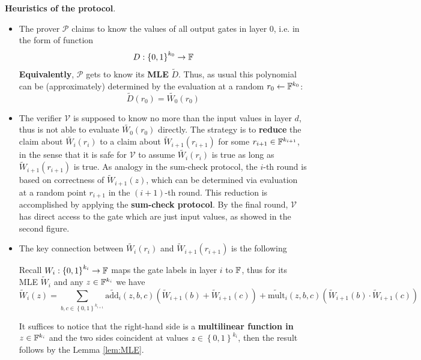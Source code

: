 \documentclass{article}
\begin{document}
\textbf{Heuristics of the protocol}. 
\begin{itemize}
\item The prover $\mathcal{P}$ claims to know the values of all output gates in layer $0$, i.e. in the form of function
\begin{equation*}
D: \left\{ 0, 1 \right\}^{k_0} \rightarrow \mathbb{F}
\end{equation*}
\textbf{Equivalently}, $\mathcal{P}$ gets to know its \textbf{MLE} $\tilde{D}$. Thus, as usual this polynomial can be (approximately) determined by the evaluation at a random $r_0 \leftarrow \mathbb{F}^{k_0}$:
\begin{equation*}
\widetilde{D}(r_0) = \widetilde{W_0}(r_0)
\end{equation*}
\item The verifier $\mathcal{V}$ is supposed to know no more than the input values in layer $d$, thus is not able to evaluate $\widetilde{W_0}(r_0)$ directly. The strategy is to \textbf{reduce} the claim about $\widetilde{W_i}(r_{i})$ to a claim about $\widetilde{W}_{i+1}(r_{i+1})$ for some $r_{i+1} \in \mathbb{F}^{k_{i+1}}$, in the sense that it is safe for $\mathcal{V}$ to assume $\widetilde{W_i}(r_{i})$ is true as long as  $\widetilde{W}_{i+1}(r_{i+1})$ is true. As analogy in the sum-check protocol, the $i$-th round is based on correctness of $\widetilde{W}_{i+1}(z)$, which can be determined via evaluation at a random point $r_{i+1}$ in the $(i+1)$-th round. This reduction is accomplished by applying the \textbf{sum-check protocol}. By the final round, $\mathcal{V}$ has direct access to the gate which are just input values, as showed in the second figure. 
\item The key connection between $\widetilde{W_i}(r_{i})$ and $\widetilde{W}_{i+1}(r_{i+1})$ is the following
\begin{lemma}
Recall $W_i: \left\{ 0, 1 \right\}^{k_i} \rightarrow \mathbb{F}$ maps the gate labels in layer $i$ to $\mathbb{F}$, thus for its MLE $\widetilde{W}_i$ and any $z \in \mathbb{F}^{k_i}$ we have
\begin{equation*}
\widetilde{W}_i(z) = \sum_{b, c \in \left\{ 0, 1 \right\}^{k_{i+1}}} \widetilde{\text{add}_i}(z, b, c)(\widetilde{W}_{i+1}(b) + \widetilde{W}_{i+1}(c)) + \widetilde{\text{mult}}_i(z, b, c)(\widetilde{W}_{i+1}(b) \cdot \widetilde{W}_{i + 1}(c))
\end{equation*}
\end{lemma}
It suffices to notice that the right-hand side is a \textbf{multilinear function in $z \in \mathbb{F}^{k_i} $} and the two sides coincident at values $z \in \left\{ 0, 1 \right\}^{k_i}$, then the result follows by the Lemma \ref{lem:MLE}. 

\end{itemize}
\end{document}
